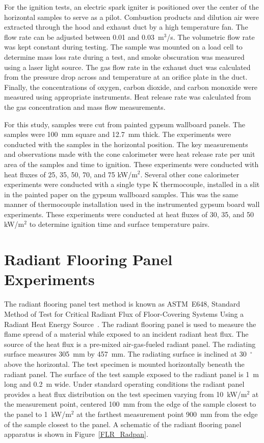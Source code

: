 \documentclass[twoside]{uocthesis}
\begin{document}
{For the ignition tests, an electric spark igniter is positioned over the center of the horizontal samples to serve as a pilot.  Combustion products and dilution air were extracted through the hood and exhaust duct by a high temperature fan. The flow rate can be adjusted between 0.01 and 0.03~m$^3$/s. The volumetric flow rate was kept constant during testing. The sample was mounted on a load cell to determine mass loss rate during a test, and smoke obscuration was measured using a laser light source. The gas flow rate in the exhaust duct was calculated from the pressure drop across and temperature at an orifice plate in the duct. Finally, the concentrations of oxygen, carbon dioxide, and carbon monoxide were measured using appropriate instruments. Heat release rate was calculated from the gas concentration and mass flow measurements.

For this study, samples were cut from painted gypsum wallboard panels. The samples were 100~mm square and 12.7~mm thick. The experiments were conducted with the samples in the horizontal position.  The key measurements and observations made with the cone calorimeter were heat release rate per unit area of the samples and time to ignition. These experiments were conducted with heat fluxes of 25, 35, 50, 70, and 75 kW/m$^2$. Several other cone calorimeter experiments were conducted with a single type K thermocouple, installed in a slit in the painted paper on the gypsum wallboard samples.  This was the same manner of thermocouple installation used in the instrumented gypsum board wall experiments.  These experiments were conducted at heat fluxes of 30, 35, and 50 kW/m$^2$ to determine ignition time and surface temperature pairs.

\section{Radiant Flooring Panel Experiments}

The radiant flooring panel test method is known as ASTM~E648, Standard Method of Test for Critical Radiant Flux of Floor-Covering Systems Using a Radiant Heat Energy Source~\cite{ASTM_E648}.  The radiant flooring panel is used to measure the flame spread of a material while exposed to an incident radiant heat flux. The source of the heat flux is a pre-mixed air-gas-fueled radiant panel.  The radiating surface measures 305~mm by 457~mm. The radiating surface is inclined at 30~$^{\circ}$ above the horizontal. The test specimen is mounted horizontally beneath the radiant panel.  The surface of the test sample exposed to the radiant panel is 1~m long and 0.2~m wide. Under standard operating conditions the radiant panel provides a heat flux distribution on the test specimen varying from 10~kW/m$^2$ at the measurement point, centered 100~mm from the edge of the sample closest to the panel to 1~kW/m$^2$ at the farthest measurement point 900~mm from the edge of the sample closest to the panel. A schematic of the radiant flooring panel apparatus is shown in Figure~\ref{FLR_Radpan}.  

}
\end{document}
